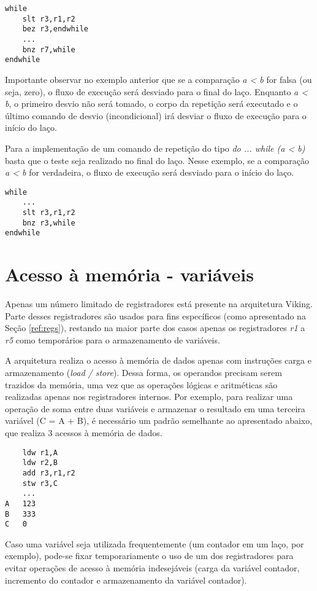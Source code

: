 \documentclass{extreport}
\begin{document}
\begin{verbatim}
while
    slt r3,r1,r2
    bez r3,endwhile
    ...
    bnz r7,while
endwhile
\end{verbatim}

Importante observar no exemplo anterior que se a comparação \textit{a < b} for falsa (ou seja, zero), o fluxo de execução será desviado para o final do laço. Enquanto \textit{a < b}, o primeiro desvio não será tomado, o corpo da repetição será executado e o último comando de desvio (incondicional) irá desviar o fluxo de execução para o início do laço.

Para a implementação de um comando de repetição do tipo \textit{do { ... } while (a < b)} basta que o teste seja realizado no final do laço. Nesse exemplo, se a comparação \textit{a < b} for verdadeira, o fluxo de execução será desviado para o início do laço.

\begin{verbatim}
while
    ...
    slt r3,r1,r2
    bnz r3,while
endwhile
\end{verbatim}

\section{Acesso à memória - variáveis}

Apenas um número limitado de registradores está presente na arquitetura Viking. Parte desses registradores são usados para fins específicos (como apresentado na Seção \ref{ref:regs}), restando na maior parte dos casos apenas os registradores \textit{r1} a \textit{r5} como temporários para o armazenamento de variáveis.

A arquitetura realiza o acesso à memória de dados apenas com instruções carga e armazenamento (\textit{load / store}). Dessa forma, os operandos precisam serem trazidos da memória, uma vez que as operações lógicas e aritméticas são realizadas apenas nos registradores internos. Por exemplo, para realizar uma operação de soma entre duas variáveis e armazenar o resultado em uma terceira variável (C = A + B), é necessário um padrão semelhante ao apresentado abaixo, que realiza 3 acessos à memória de dados.

\begin{verbatim}
    ldw r1,A
    ldw r2,B
    add r3,r1,r2
    stw r3,C
    ...
A   123
B   333
C   0
\end{verbatim}

Caso uma variável seja utilizada frequentemente (um contador em um laço, por exemplo), pode-se fixar temporariamente o uso de um dos registradores para evitar operações de acesso à memória indesejáveis (carga da variável contador, incremento do contador e armazenamento da variável contador).
\end{document}
